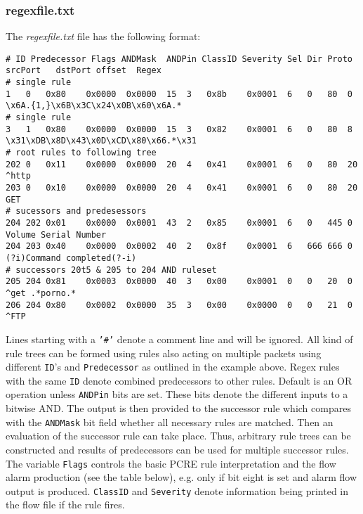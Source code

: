 \documentclass[documentation]{subfiles}
\begin{document}
\subsubsection{regexfile.txt}\label{regexfile.txt}
The {\em regexfile.txt} file has the following format:
\begin{center}
\begin{lstlisting}
# ID Predecessor Flags ANDMask	ANDPin ClassID Severity Sel	Dir	Proto srcPort	dstPort	offset	Regex
# single rule
1	0	0x80	0x0000	0x0000	15	3	0x8b	0x0001	6	0	80	0	\x6A.{1,}\x6B\x3C\x24\x0B\x60\x6A.*
# single rule
3	1	0x80	0x0000	0x0000	15	3	0x82    0x0001	6	0	80	8	\x31\xDB\x8D\x43\x0D\xCD\x80\x66.*\x31
# root rules to following tree
202	0	0x11	0x0000	0x0000	20	4	0x41	0x0001	6	0	80	20	^http
203	0	0x10	0x0000	0x0000	20	4	0x41	0x0001	6	0	80	20	GET
# sucessors and predesessors
204	202	0x01	0x0000	0x0001	43	2	0x85	0x0001	6	0	445	0	Volume Serial Number
204	203	0x40	0x0000	0x0002	40	2	0x8f	0x0001	6	666	666	0	(?i)Command completed(?-i)
# successors 20t5 & 205 to 204 AND ruleset
205	204	0x81	0x0003	0x0000	40	3	0x00	0x0001	0	0	20	0	^get .*porno.*
206	204	0x80	0x0002	0x0000	35	3	0x00	0x0000	0	0	21	0	^FTP
\end{lstlisting}
\end{center}

Lines starting with a {\tt '\#'} denote a comment line and will be ignored.
All kind of rule trees can be formed using rules also acting on multiple packets using different {\tt ID}'s and {\tt Predecessor} as outlined in the example above.
Regex rules with the same {\tt ID} denote combined predecessors to other rules. Default is an OR operation unless {\tt ANDPin} bits are set. These bits denote the different inputs to a bitwise AND. The output is then provided
to the successor rule which compares with the {\tt ANDMask} bit field whether all necessary rules are matched.
Then an evaluation of the successor rule can take place. Thus, arbitrary rule trees can be constructed and results of
predecessors can be used for multiple successor rules. The variable {\tt Flags} controls the basic PCRE rule interpretation and the flow alarm production (see the table below), e.g. only if bit eight is set and alarm flow output is produced. {\tt ClassID} and {\tt Severity} denote information being printed in the flow file if the rule fires.
\end{document}
